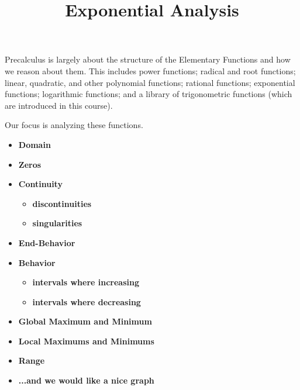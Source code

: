 \documentclass{ximera}
\title{Exponential Analysis}
\begin{document}
\begin{abstract}
\end{abstract}
\maketitle




Precalculus is largely about the structure of the Elementary Functions and how we reason about them.  This includes power functions; radical and root functions; linear, quadratic, and other polynomial functions; rational functions; exponential functions; logarithmic functions; and a library of trigonometric functions (which are introduced in this course).


Our focus is analyzing these functions.





\begin{itemize}
     \item \textbf{\textcolor{red!80!black}{Domain}} 
     \item \textbf{\textcolor{red!80!black}{Zeros}} 
     \item \textbf{\textcolor{red!80!black}{Continuity}} 
\begin{itemize}
     \item \textbf{\textcolor{purple!85!blue}{discontinuities}} 
     \item \textbf{\textcolor{purple!85!blue}{singularities}} 
\end{itemize}
     \item \textbf{\textcolor{red!80!black}{End-Behavior}} 
     \item \textbf{\textcolor{red!80!black}{Behavior}} 
\begin{itemize}
     \item \textbf{\textcolor{purple!85!blue}{intervals where increasing}} 
     \item \textbf{\textcolor{purple!85!blue}{intervals where decreasing}} 
\end{itemize}
     \item \textbf{\textcolor{red!80!black}{Global Maximum and Minimum}} 
     \item \textbf{\textcolor{red!80!black}{Local Maximums and Minimums}} 
     \item \textbf{\textcolor{red!80!black}{Range}} 
     \item \textbf{\textcolor{blue!55!black}{...and we would like a nice graph}} 
\end{itemize}
\end{document}
